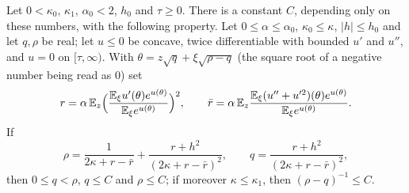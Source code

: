 \begin{theorem}\label{thm:sg-tal:st-rs-bounds}
  \leanok
Let $0<\kappa_0$, $\kappa_1$, $\alpha_0<2$, $h_0$ and $\tau\ge0$. There is a constant $C$, depending only on
these numbers, with the following property. Let $0\le\alpha\le\alpha_0$, $\kappa_0\le\kappa$,
$|h|\le h_0$ and let $q,\rho$ be real; let $u\le0$ be concave, twice differentiable with bounded $u'$ and $u''$, and
$u=0$ on $[\tau,\infty)$. With $\theta=z\sqrt q+\xi\sqrt{\rho-q}$ (the square root of a negative number
being read as $0$) set
\[
r=\alpha\,\mathbb E_z\Bigl(\frac{\mathbb E_\xi u'(\theta)e^{u(\theta)}}{\mathbb E_\xi e^{u(\theta)}}\Bigr)^2,\qquad
\bar r=\alpha\,\mathbb E_z\frac{\mathbb E_\xi(u''+u'^2)(\theta)e^{u(\theta)}}{\mathbb E_\xi e^{u(\theta)}} .
\]
If
\[
\rho=\frac1{2\kappa+r-\bar r}+\frac{r+h^2}{(2\kappa+r-\bar r)^2},\qquad
q=\frac{r+h^2}{(2\kappa+r-\bar r)^2},
\]
then $0\le q<\rho$, $q\le C$ and $\rho\le C$; if moreover $\kappa\le\kappa_1$, then $(\rho-q)^{-1}\le C$.
\end{theorem}
